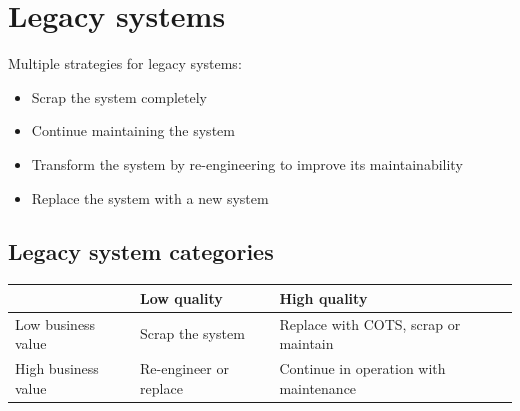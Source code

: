 \documentclass{article}[18pt]
\begin{document}
\section{Legacy systems}
Multiple strategies for legacy systems:
\begin{itemize}
	\item Scrap the system completely
	\item Continue maintaining the system
	\item Transform the system by re-engineering to improve its maintainability
	\item Replace the system with a new system
\end{itemize}
\subsection{Legacy system categories}
{\renewcommand{\arraystretch}{2}
\begin{tabularx}{\textwidth}{|X|X|X|}
\hline
& Low quality & High quality\\
\hline
Low business value& Scrap the system & Replace with COTS, scrap or maintain\\
\hline
High business value& Re-engineer or replace& Continue in operation with maintenance\\
\hline
\end{tabularx}}
\end{document}
